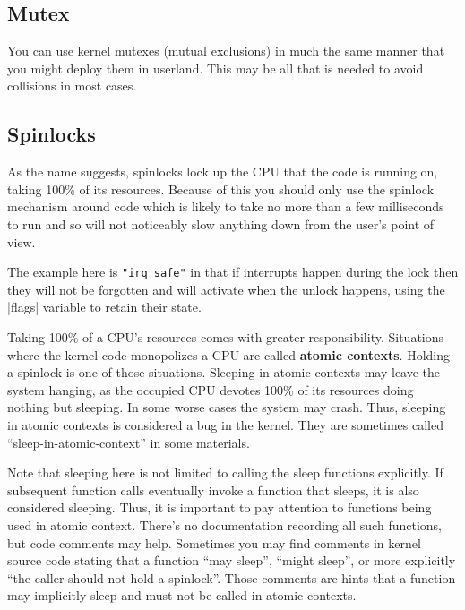 \documentclass[10pt, oneside]{book}
\begin{document}
\subsection{Mutex}
\label{sec:mutex}
You can use kernel mutexes (mutual exclusions) in much the same manner that you might deploy them in userland.
This may be all that is needed to avoid collisions in most cases.


\subsection{Spinlocks}
\label{sec:spinlock}
As the name suggests, spinlocks lock up the CPU that the code is running on, taking 100\% of its resources.
Because of this you should only use the spinlock mechanism around code which is likely to take no more than a few milliseconds to run and so will not noticeably slow anything down from the user's point of view.

The example here is \verb|"irq safe"| in that if interrupts happen during the lock then they will not be forgotten and will activate when the unlock happens, using the \cpp|flags| variable to retain their state.


Taking 100\% of a CPU's resources comes with greater responsibility.
Situations where the kernel code monopolizes a CPU are called \textbf{atomic contexts}.
Holding a spinlock is one of those situations.
Sleeping in atomic contexts may leave the system hanging, as the occupied CPU devotes 100\% of its resources doing nothing but sleeping.
In some worse cases the system may crash.
Thus, sleeping in atomic contexts is considered a bug in the kernel.
They are sometimes called ``sleep-in-atomic-context'' in some materials.

Note that sleeping here is not limited to calling the sleep functions explicitly.
If subsequent function calls eventually invoke a function that sleeps, it is also considered sleeping.
Thus, it is important to pay attention to functions being used in atomic context.
There's no documentation recording all such functions, but code comments may help.
Sometimes you may find comments in kernel source code stating that a function ``may sleep'', ``might sleep'', or more explicitly ``the caller should not hold a spinlock''.
Those comments are hints that a function may implicitly sleep and must not be called in atomic contexts.
\end{document}
